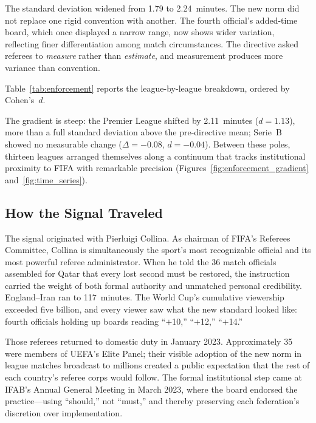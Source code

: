 The standard deviation widened from 1.79 to 2.24~minutes. The new norm
did not replace one rigid convention with another. The fourth official's
added-time board, which once displayed a narrow range, now shows wider
variation, reflecting finer differentiation among match circumstances.
The directive asked referees to \textit{measure} rather than
\textit{estimate}, and measurement produces more variance than
convention.

Table~\ref{tab:enforcement} reports the league-by-league breakdown,
ordered by Cohen's~$d$.



The gradient is steep: the Premier League
shifted by 2.11~minutes ($d = 1.13$), more than a full standard
deviation above the pre-directive mean; Serie~B showed no measurable
change ($\Delta = -0.08$, $d = -0.04$). Between these poles, thirteen
leagues arranged themselves along a continuum that tracks institutional
proximity to FIFA with remarkable precision
(Figures~\ref{fig:enforcement_gradient} and~\ref{fig:time_series}).


\subsection{How the Signal Traveled}
\label{sec:first_stage:channels}

The signal originated with Pierluigi Collina. As chairman of FIFA's
Referees Committee, Collina is simultaneously the sport's most
recognizable official and its most powerful referee administrator.
When he told the 36 match officials assembled for Qatar that every
lost second must be restored, the instruction carried the weight of
both formal authority and unmatched personal credibility.
England--Iran ran to 117~minutes. The World Cup's cumulative viewership
exceeded five billion, and every viewer saw what the new standard
looked like: fourth officials holding up boards reading ``$+$10,''
``$+$12,'' ``$+$14.''

Those referees returned to domestic duty in January 2023.
Approximately 35 were members of UEFA's Elite Panel; their visible
adoption of the new norm in league matches broadcast to millions
created a public expectation that the rest of each country's referee
corps would follow. The formal institutional step came at IFAB's
Annual General Meeting in March 2023, where the board endorsed the
practice---using ``should,'' not ``must,'' and thereby preserving each
federation's discretion over implementation.

